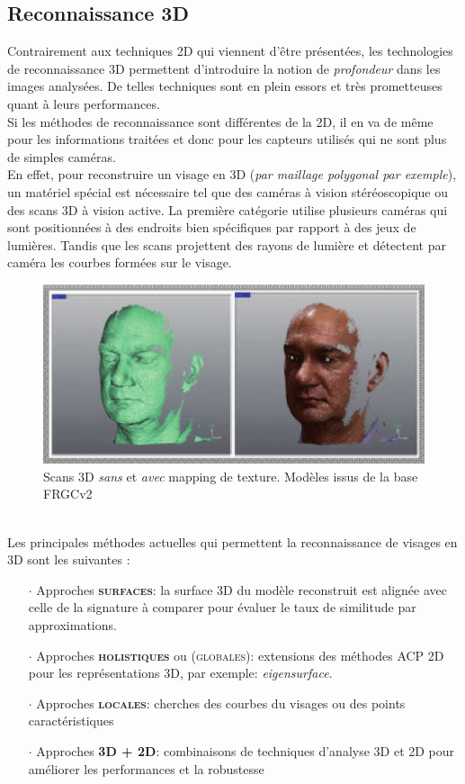 \subsection{Reconnaissance 3D}
Contrairement aux techniques 2D qui viennent d'être présentées, les technologies de reconnaissance 3D permettent d'introduire la notion de \textit{profondeur} dans les images analysées. De telles techniques sont en plein essors et très prometteuses quant à leurs performances.
\\
Si les méthodes de reconnaissance sont différentes de la 2D, il en va de même pour les informations traitées et donc pour les capteurs utilisés qui ne sont plus de simples caméras. 
\\En effet, pour reconstruire un visage en 3D (\textit{par maillage polygonal par exemple}), un matériel spécial est nécessaire tel que des caméras à vision stéréoscopique ou des scans 3D à vision active. La première catégorie utilise plusieurs caméras qui sont positionnées à des endroits bien spécifiques par rapport à des jeux de lumières. Tandis que les scans projettent des rayons de lumière et détectent par caméra les courbes formées sur le visage.
\begin{figure}[h!]
\center\includegraphics[scale=.35]{images/scans-3D}
\caption{Scans 3D \textit{sans} et \textit{avec} mapping de texture. Modèles issus de la base FRGCv2 \cite{Xphdthesis_4}}
\end{figure}\\
Les principales méthodes actuelles qui permettent la reconnaissance de visages en 3D sont les suivantes \cite{Xphdthesis_4}:
\begin{itemize}\setlength{\itemsep}{.2em}
\item[$\cdot$]Approches \textsc{\textbf{surfaces}}: la surface 3D du modèle reconstruit est alignée avec celle de la signature à comparer pour évaluer le taux de similitude par approximations.
\item[$\cdot$]Approches \textsc{\textbf{holistiques}} ou (\textsc{globales}): extensions des méthodes ACP 2D pour les représentations 3D, par exemple: \textit{eigensurface}.
\item[$\cdot$]Approches \textsc{\textbf{locales}}: cherches des courbes du visages ou des points caractéristiques
\item[$\cdot$]Approches \textsc{\textbf{3D + 2D}}: combinaisons de techniques d'analyse 3D et 2D pour améliorer les performances et la robustesse
\end{itemize}
